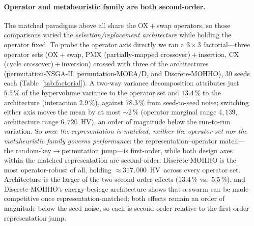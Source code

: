 \documentclass[runningheads]{llncs}
\newcommand{\HV}{\textsf{HV}}
\begin{document}
\paragraph{Operator and metaheuristic family are both second-order.}
The matched paradigms above all share the OX${}+{}$swap operators, so those comparisons varied the \emph{selection/replacement architecture} while holding the operator fixed. To probe the operator axis directly we ran a $3\times3$ factorial---three operator sets (OX${}+{}$swap, PMX (partially-mapped crossover)${}+{}$insertion, CX (cycle crossover)${}+{}$inversion) crossed with three of the architectures (permutation-NSGA-II, permutation-MOEA/D, and Discrete-MOHHO), 30 seeds each (Table~\ref{tab:factorial}). A two-way variance decomposition attributes just $5.5\,\%$ of the hypervolume variance to the operator set and $13.4\,\%$ to the architecture (interaction $2.9\,\%$), against $78.3\,\%$ from seed-to-seed noise; switching either axis moves the mean by at most ${\sim}2\,\%$ (operator marginal range $4{,}139$, architecture range $6{,}720$~\HV), an order of magnitude below the run-to-run variation. So \emph{once the representation is matched, neither the operator set nor the metaheuristic family governs performance}: the representation--operator match---the random-key$\to$permutation jump---is first-order, while both design axes within the matched representation are second-order. Discrete-MOHHO is the most operator-robust of all, holding ${\approx}317{,}000$~\HV\ across every operator set. Architecture is the larger of the two second-order effects ($13.4\,\%$ vs.\ $5.5\,\%$), and Discrete-MOHHO's energy-besiege architecture shows that a swarm can be made competitive once representation-matched; both effects remain an order of magnitude below the seed noise, so each is second-order relative to the first-order representation jump.
\end{document}
